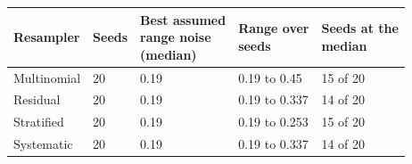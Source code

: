 \begin{tabular}{lllll}
\toprule
Resampler & Seeds & \shortstack[l]{Best assumed\\range noise\\(median)} & \shortstack[l]{Range over\\seeds} & \shortstack[l]{Seeds at the\\median} \\
\midrule
Multinomial & 20 & 0.19 & 0.19 to 0.45 & 15 of 20 \\
Residual & 20 & 0.19 & 0.19 to 0.337 & 14 of 20 \\
Stratified & 20 & 0.19 & 0.19 to 0.253 & 15 of 20 \\
Systematic & 20 & 0.19 & 0.19 to 0.337 & 14 of 20 \\
\bottomrule
\end{tabular}
